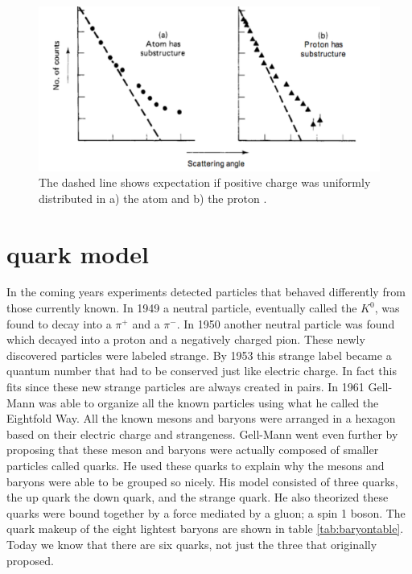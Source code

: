 \documentclass[abstract = on,listof=totoc, bibliography=totoc]{scrreprt}
\begin{document}
\begin{figure}
\begin{center}
\includegraphics[width = .6\textwidth]{protonSubstructureScattering}
\caption[Scattering at SLAC shows proton substructure]{The dashed line shows expectation if positive charge was uniformly distributed in a) the atom and b) the proton \cite{IEP}.}
\label{fig:protonSubstructureScattering}
\end{center}
\end{figure}





\section{quark model}

In the coming years experiments detected particles that behaved differently from those currently known. In 1949 a neutral particle, eventually called the $K^0$, was found to decay into a $\pi^+$ and a $\pi^-$. In 1950 another neutral particle was found which decayed into a proton and a negatively charged pion. These newly discovered particles were labeled strange. By 1953 this strange label became a quantum number that had to be conserved just like electric charge. In fact this fits since these new strange particles are always created in pairs. In 1961 Gell-Mann was able to organize all the known particles using what he called the Eightfold Way. All the known mesons and baryons were arranged in a hexagon based on their electric charge and strangeness.  Gell-Mann went even further by proposing that these meson and baryons were actually composed of smaller particles called quarks. He used these quarks to explain why the mesons and baryons were able to be grouped so nicely. His model consisted of three quarks, the up quark the down quark, and the strange quark. He also theorized these quarks were bound together by a force mediated by a gluon; a spin 1 boson. The quark makeup of the eight lightest baryons are shown in table \ref{tab:baryontable}. Today we know that there are six quarks, not just the three that originally proposed. 
\end{document}
